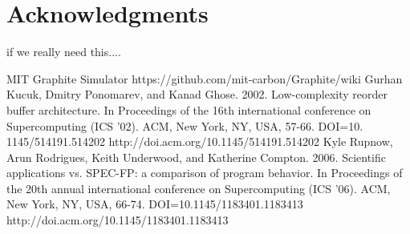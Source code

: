 \documentclass{acm_proc_article-sp}
\begin{document}
\section{Acknowledgments}
if we really need this....

\begin{thebibliography}{------}
	MIT Graphite Simulator
	https://github.com/mit-carbon/Graphite/wiki
Gurhan Kucuk, Dmitry Ponomarev, and Kanad Ghose. 2002. Low-complexity reorder buffer architecture. In Proceedings
of the 16th international conference on Supercomputing (ICS '02). ACM, New York, NY, USA, 57-66. DOI=10.
1145/514191.514202 http://doi.acm.org/10.1145/514191.514202
Kyle Rupnow, Arun Rodrigues, Keith Underwood, and Katherine Compton. 2006. Scientific applications vs. SPEC-FP: a comparison of program behavior. In Proceedings of the 20th annual international conference on Supercomputing (ICS '06). ACM, New York, NY, USA, 66-74. DOI=10.1145/1183401.1183413 http://doi.acm.org/10.1145/1183401.1183413 


\end{thebibliography}
\end{document}
